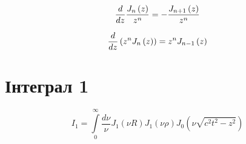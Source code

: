 \begin{equation}
\frac{d }{d z} \frac{ J_n \left( z \right) }{ z^n }  = 
- \frac{ J_{n+1} \left( z \right) }{ z^n }
\end{equation}

\begin{equation}
\frac{d }{d z} \left( z^n J_n \left( z \right) \right)  = 
z^n J_{n-1} \left( z \right)
\end{equation}

\section{Інтеграл 1}
%
\begin{equation} \label{eq:int1start}
I_1 = \int\limits_{0}^{\infty} \frac{d\nu}{\nu} 
J_1 \left( \nu R \right) J_1 \left( \nu \rho \right) 
J_0 \left( \nu \sqrt{c^2 t^2 - z^2} \right)
\end{equation}

